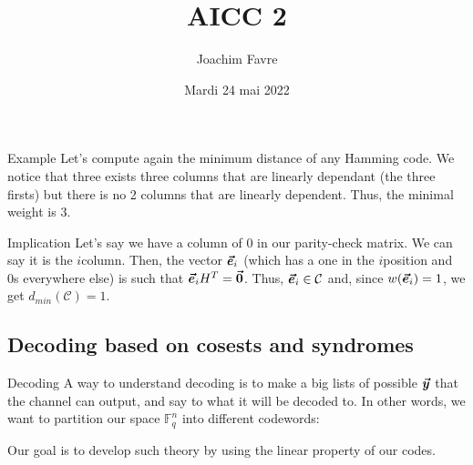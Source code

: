 \documentclass[a4paper]{article}
\title{AICC 2}
\author{Joachim Favre}
\date{Mardi 24 mai 2022}
\begin{document}
\maketitle


\begin{parag}{Example}
    Let's compute again the minimum distance of any Hamming code. We notice that three exists three columns that are linearly dependant (the three firsts) but there is no 2 columns that are linearly dependent. Thus, the minimal weight is 3.
\end{parag}

\begin{parag}{Implication}
    Let's say we have a column of 0 in our parity-check matrix. We can say it is the $i$\Th column. Then, the vector $\bm{\protect\vec{e}}_i$ (which has a one in the $i$\Th position and 0s everywhere else) is such that $\bm{\protect\vec{e}}_i H^T = \bm{\protect\vec{0}}$. Thus, $\bm{\protect\vec{e}}_i \in \mathcal{C}$ and, since $w\left(\bvec{e}_i\right) = 1$, we get $d_{min}\left(\mathcal{C}\right) = 1$.
\end{parag}

\subsection{Decoding based on cosests and syndromes}
\begin{parag}{Decoding}
    A way to understand decoding is to make a big lists of possible $\bm{\protect\vec{y}}$ that the channel can output, and say to what it will be decoded to. In other words, we want to partition our space $\mathbb{F}_q^n$ into different codewords:

    Our goal is to develop such theory by using the linear property of our codes.
\end{parag}
\end{document}
